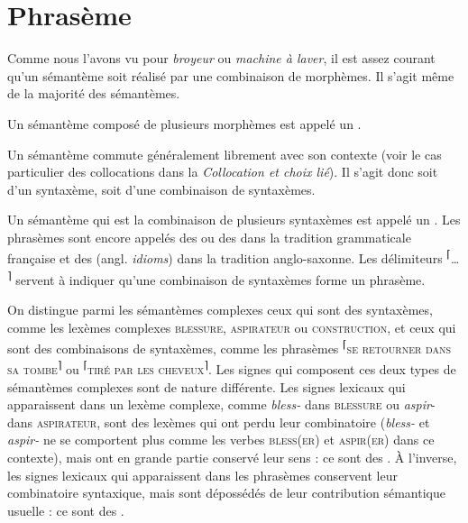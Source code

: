 \section{Phrasème}\label{sec:2.3.7}

Comme nous l’avons vu pour \textit{broyeur} ou \textit{machine à laver}, il est assez courant qu’un sémantème soit réalisé par une combinaison de morphèmes. Il s’agit même de la majorité des sémantèmes.

\begin{styleLivreImportant}
Un sémantème composé de plusieurs morphèmes est appelé un .
\end{styleLivreImportant}

Un sémantème commute généralement librement avec son contexte (voir le cas particulier des collocations dans la  \textit{Collocation et choix lié}). Il s’agit donc soit d’un syntaxème, soit d’une combinaison de syntaxèmes.

\begin{styleLivreImportant}
Un sémantème qui est la combinaison de plusieurs syntaxèmes est appelé un . Les phrasèmes sont encore appelés des  ou des  dans la tradition grammaticale française et des  (angl. \textit{idioms}) dans la tradition anglo-saxonne. Les délimiteurs \textsuperscript{⌈}…\textsuperscript{ ⌉} servent à indiquer qu’une combinaison de syntaxèmes forme un phrasème.
\end{styleLivreImportant}

On distingue parmi les sémantèmes complexes ceux qui sont des syntaxèmes, comme les lexèmes complexes \textsc{blessure,} \textsc{aspirateur} ou \textsc{construction,} et ceux qui sont des combinaisons de syntaxèmes, comme les phrasèmes \textsuperscript{⌈}\textsc{se} \textsc{retourner} \textsc{dans} \textsc{sa} \textsc{tombe}\textsuperscript{⌉} ou \textsuperscript{⌈}\textsc{tiré} \textsc{par} \textsc{les} \textsc{cheveux}\textsuperscript{⌉}. Les signes qui composent ces deux types de sémantèmes complexes sont de nature différente. Les signes lexicaux qui apparaissent dans un lexème complexe, comme \textit{bless-} dans \textsc{blessure} ou \textit{aspir}{}- dans \textsc{aspirateur}, sont des lexèmes qui ont perdu leur combinatoire (\textit{bless-} et \textit{aspir-} ne se comportent plus comme les verbes \textsc{bless}(\textsc{er}) et \textsc{aspir}(\textsc{er}) dans ce contexte), mais ont en grande partie conservé leur sens : ce sont des . À l’inverse, les signes lexicaux qui apparaissent dans les phrasèmes conservent leur combinatoire syntaxique, mais sont dépossédés de leur contribution sémantique usuelle : ce sont des .

